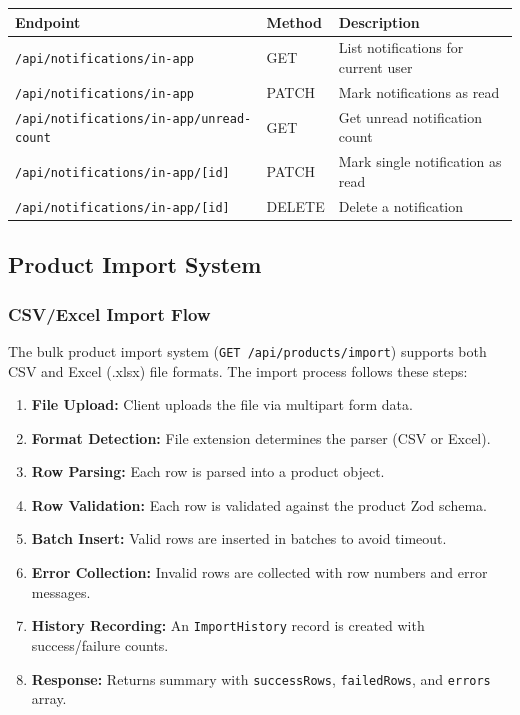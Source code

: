 \documentclass[12pt,onecolumn]{IEEEtran}
\begin{document}
\begin{center}
\begin{tabularx}{\textwidth}{llX}
  \toprule
  \textbf{Endpoint} & \textbf{Method} & \textbf{Description} \\
  \midrule
  \texttt{/api/notifications/in-app}              & GET   & List notifications for current user \\
  \texttt{/api/notifications/in-app}              & PATCH & Mark notifications as read \\
  \texttt{/api/notifications/in-app/unread-count} & GET   & Get unread notification count \\
  \texttt{/api/notifications/in-app/[id]}         & PATCH & Mark single notification as read \\
  \texttt{/api/notifications/in-app/[id]}         & DELETE & Delete a notification \\
  \bottomrule
\end{tabularx}
\end{center}

\subsection{Product Import System}

\subsubsection{CSV/Excel Import Flow}

The bulk product import system (\texttt{GET /api/products/import}) supports both CSV and Excel (.xlsx) file formats. The import process follows these steps:

\begin{enumerate}[leftmargin=1.5em]
  \item \textbf{File Upload:} Client uploads the file via multipart form data.
  \item \textbf{Format Detection:} File extension determines the parser (CSV or Excel).
  \item \textbf{Row Parsing:} Each row is parsed into a product object.
  \item \textbf{Row Validation:} Each row is validated against the product Zod schema.
  \item \textbf{Batch Insert:} Valid rows are inserted in batches to avoid timeout.
  \item \textbf{Error Collection:} Invalid rows are collected with row numbers and error messages.
  \item \textbf{History Recording:} An \texttt{ImportHistory} record is created with success/failure counts.
  \item \textbf{Response:} Returns summary with \texttt{successRows}, \texttt{failedRows}, and \texttt{errors} array.
\end{enumerate}
\end{document}
